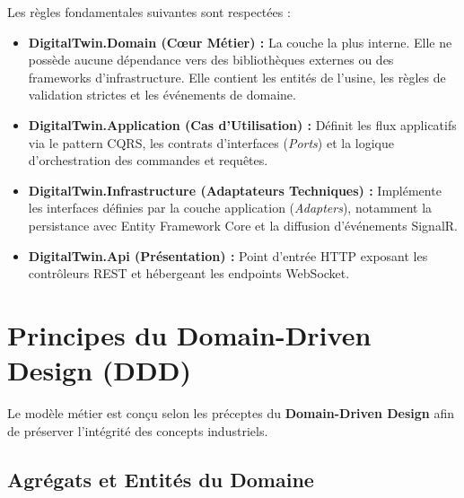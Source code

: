 Les règles fondamentales suivantes sont respectées :
\begin{itemize}
    \item \textbf{DigitalTwin.Domain (Cœur Métier) :} La couche la plus interne. Elle ne possède aucune dépendance vers des bibliothèques externes ou des frameworks d'infrastructure. Elle contient les entités de l'usine, les règles de validation strictes et les événements de domaine.
    \item \textbf{DigitalTwin.Application (Cas d'Utilisation) :} Définit les flux applicatifs via le pattern CQRS, les contrats d'interfaces (\textit{Ports}) et la logique d'orchestration des commandes et requêtes.
    \item \textbf{DigitalTwin.Infrastructure (Adaptateurs Techniques) :} Implémente les interfaces définies par la couche application (\textit{Adapters}), notamment la persistance avec Entity Framework Core et la diffusion d'événements SignalR.
    \item \textbf{DigitalTwin.Api (Présentation) :} Point d'entrée HTTP exposant les contrôleurs REST et hébergeant les endpoints WebSocket.
\end{itemize}

\section{Principes du Domain-Driven Design (DDD)}

Le modèle métier est conçu selon les préceptes du \textbf{Domain-Driven Design} \cite{evans2003domain} afin de préserver l'intégrité des concepts industriels.

\subsection{Agrégats et Entités du Domaine}

